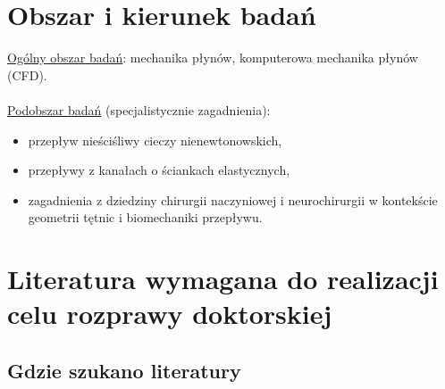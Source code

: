 \documentclass[11pt]{article} %
\begin{document}

\tableofcontents %

\newpage %


\section{Obszar i kierunek badań} %

\underline{Ogólny obszar badań}:  mechanika płynów, komputerowa mechanika płynów (CFD).\\
\\
\underline{Podobszar badań} (specjalistycznie zagadnienia): 

\begin{itemize} 
\item przepływ nieściśliwy cieczy nienewtonowskich, 
\item przepływy z kanałach o ściankach elastycznych,
\item zagadnienia z dziedziny chirurgii naczyniowej i neurochirurgii w kontekście geometrii tętnic i biomechaniki przepływu. \\
\end{itemize}



\section{Literatura wymagana do realizacji celu rozprawy doktorskiej} %


\subsection{Gdzie szukano literatury} %
\end{document}
